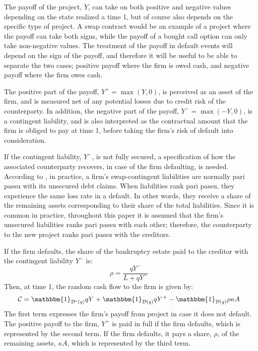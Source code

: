 \documentclass[../main.tex]{subfiles}
\begin{document}
        The payoff of the project, $Y$, can take on both positive and negative values
        depending on the state realized a time 1, 
        but of course also depends on the specific type of project. 
        A swap contract would be an example of a project where the payoff can take both signs,
        while the payoff of a bought call option can only take non-negative values.
        The treatment of the payoff in default events will depend on the sign of the payoff,
        and therefore it will be useful to be able to separate the two cases;
        positive payoff where the firm is owed cash,
        and negative payoff where the firm owes cash.

        The positive part of the payoff, $Y^{+}=\max\left(Y,0\right)$, is perceived as an asset of the firm, and is measured net of any potential losses due to credit risk of the counterparty.
        In addition, the negative part of the payoff, $Y^{-} = \max \left(-Y,0\right)$, is a contingent liability, and is also interpreted as the contractual amount that the firm is obliged to pay at time 1, before taking the firm's risk of default into consideration.

        If the contingent liability, $Y^{-}$, is not fully secured, a specification of how the associated counterparty recovers, in case of the firm defaulting, is needed.
        According to \textcite{ADS2019}, in practice, a firm's swap-contingent liabilities 
        are normally pari passu with its unsecured debt claims.
        When liabilities rank pari passu, they experience the same loss rate in a default.
        In other words, they receive a share of the remaining assets 
        corresponding to their share of the total liabilities.
        Since it is common in practice, throughout this paper it is assumed that the firm's 
        unsecured liabilities ranks pari passu with each other;
        therefore, the counterparty to the new project ranks pari passu with the creditors.

        If the firm defaults, the share of the bankruptcy estate paid to the creditor with 
        the contingent liability $Y^{-}$ is:
            \begin{equation*}
                \rho = 
                \frac{
                    qY^{-}
                }{
                    L + qY^{-}
                } 
            \end{equation*}
        Then, at time 1, the random cash flow to the firm is given by:
        \begin{equation}
            \mathcal{C} 
            = 
            \mathbbm{1}_{\mathcal{D}^{c}(q)} qY
            + \mathbbm{1}_{\mathcal{D}(q)} qY^{+}
            - \mathbbm{1}_{\mathcal{D}(q)} \rho \kappa A
        \end{equation}
        The first term expresses the firm's payoff from project in case it does not default. 
        The positive payoff to the firm, $Y^{+}$ is paid in full if the firm defaults,
        which is represented by the second term.
        If the firm defaults, it pays a share, $\rho$, of the remaining assets, $\kappa A$,
        which is represented by the third term.
\end{document}
